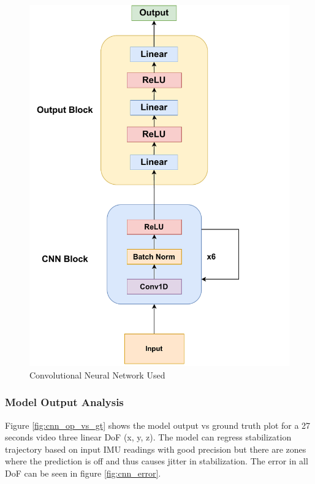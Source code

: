 \begin{figure}
    \centering
    \includegraphics[scale=1]{images/fig_chapter2/nns/cnn_mt.pdf}
    \caption{Convolutional Neural Network Used}
    \label{fig:cnn_used}
\end{figure}

\subsubsection{Model Output Analysis}
Figure \ref{fig:cnn_op_vs_gt} shows the model output vs ground truth plot for a 27 seconds video three linear DoF (x, y, z). The model can regress stabilization trajectory based on input IMU readings with good precision but there are zones where the prediction is off and thus causes jitter in stabilization. The error in all DoF can be seen in figure \ref{fig:cnn_error}.

